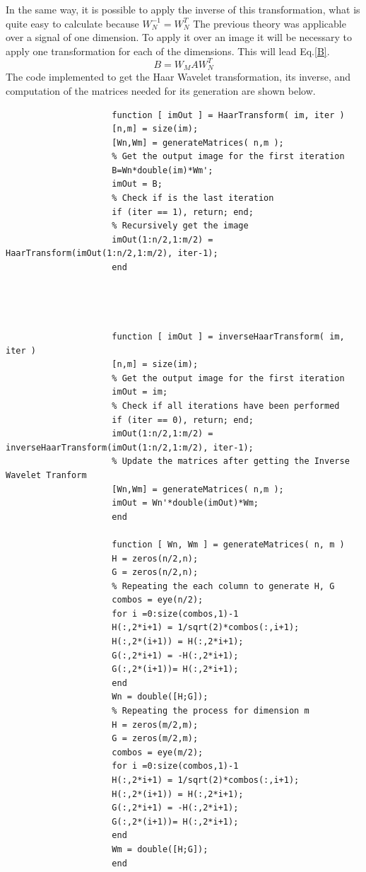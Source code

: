 \documentclass[a4paper, 10pt, conference] {article}
\begin{document}
In the same way, it is possible to apply the inverse of this transformation, what is quite easy to calculate because $W_{N}^{-1} = W_{N}^{T}$
The previous theory was applicable over a signal of one dimension. To apply it over an image it will be necessary to apply one transformation for each of the dimensions. This will lead Eq.\ref{B}.
 \begin{equation}
 B = W_{M}AW_{N}^{T}
 \label{B}
 \end{equation}
 The code implemented to get the Haar Wavelet transformation, its inverse, and computation of the matrices needed for its generation are shown below.
 
 \begin{lstlisting}
					 function [ imOut ] = HaarTransform( im, iter )
					 [n,m] = size(im);
					 [Wn,Wm] = generateMatrices( n,m );
					 % Get the output image for the first iteration
					 B=Wn*double(im)*Wm'; 
					 imOut = B; 
					 % Check if is the last iteration
					 if (iter == 1), return; end;    
					 % Recursively get the image
					 imOut(1:n/2,1:m/2) = HaarTransform(imOut(1:n/2,1:m/2), iter-1); 
					 end
					 
					 
					 
					 
					 function [ imOut ] = inverseHaarTransform( im, iter )
					 [n,m] = size(im);
					 % Get the output image for the first iteration
					 imOut = im;
					 % Check if all iterations have been performed
					 if (iter == 0), return; end; 
					 imOut(1:n/2,1:m/2) = inverseHaarTransform(imOut(1:n/2,1:m/2), iter-1);
					 % Update the matrices after getting the Inverse Wavelet Tranform   
					 [Wn,Wm] = generateMatrices( n,m );
					 imOut = Wn'*double(imOut)*Wm;
					 end
					 
					 function [ Wn, Wm ] = generateMatrices( n, m )
					 H = zeros(n/2,n);
					 G = zeros(n/2,n);
					 % Repeating the each column to generate H, G
					 combos = eye(n/2); 
					 for i =0:size(combos,1)-1
					 H(:,2*i+1) = 1/sqrt(2)*combos(:,i+1);   
					 H(:,2*(i+1)) = H(:,2*i+1);
					 G(:,2*i+1) = -H(:,2*i+1);  
					 G(:,2*(i+1))= H(:,2*i+1);
					 end
					 Wn = double([H;G]);
					 % Repeating the process for dimension m
					 H = zeros(m/2,m);
					 G = zeros(m/2,m);
					 combos = eye(m/2); 
					 for i =0:size(combos,1)-1
					 H(:,2*i+1) = 1/sqrt(2)*combos(:,i+1); 
					 H(:,2*(i+1)) = H(:,2*i+1);
					 G(:,2*i+1) = -H(:,2*i+1);  
					 G(:,2*(i+1))= H(:,2*i+1);
					 end
					 Wm = double([H;G]);
					 end
		 
 \end{lstlisting}
 
\end{document}
